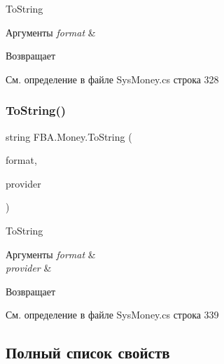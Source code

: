 To\+String 


\begin{DoxyParams}{Аргументы}
{\em format} & \\
\hline
\end{DoxyParams}
\begin{DoxyReturn}{Возвращает}

\end{DoxyReturn}


См. определение в файле Sys\+Money.\+cs строка 328

\mbox{\label{struct_f_b_a_1_1_money_aebcac29699bcc1143675ab8f238ab672}} 
\subsubsection{\texorpdfstring{To\+String()}{ToString()}\hspace{0.1cm}{\footnotesize\ttfamily [4/4]}}
{\footnotesize\ttfamily string F\+B\+A.\+Money.\+To\+String (\begin{DoxyParamCaption}\item[{string}]{format,  }\item[{I\+Format\+Provider}]{provider }\end{DoxyParamCaption})}



To\+String 


\begin{DoxyParams}{Аргументы}
{\em format} & \\
\hline
{\em provider} & \\
\hline
\end{DoxyParams}
\begin{DoxyReturn}{Возвращает}

\end{DoxyReturn}


См. определение в файле Sys\+Money.\+cs строка 339



\subsection{Полный список свойств}
\mbox{\label{struct_f_b_a_1_1_money_a925b0bea7bd578bcc9d6b8af4c4306f9}} 
